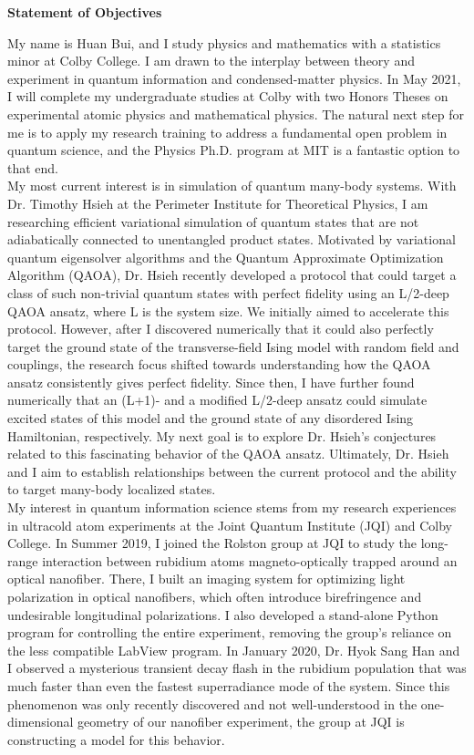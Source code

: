 \documentclass[12pt]{article}
\begin{document}
\begin{center}
	\textbf{Statement of Objectives}
\end{center}
My name is Huan Bui, and I study physics and mathematics with a statistics minor at Colby College. I am drawn to the interplay between theory and experiment in quantum information and condensed-matter physics.  In May 2021, I will complete my undergraduate studies at Colby with two Honors Theses on experimental atomic physics and mathematical physics. The natural next step for me is to apply my research training to address a fundamental open problem in quantum science, and the Physics Ph.D. program at MIT is a fantastic option to that end.  \\ 

My most current interest is in simulation of quantum many-body systems. With Dr. Timothy Hsieh at the Perimeter Institute for Theoretical Physics, I am researching efficient variational simulation of quantum states that are not adiabatically connected to unentangled product states. Motivated by variational quantum eigensolver algorithms and the Quantum Approximate Optimization Algorithm (QAOA), Dr. Hsieh recently developed a protocol that could target a class of such non-trivial quantum states with perfect fidelity using an L/2-deep QAOA ansatz, where L is the system size. We initially aimed to accelerate this protocol. However, after I discovered numerically that it could also perfectly target the ground state of the transverse-field Ising model with random field and couplings, the research focus shifted towards understanding how the QAOA ansatz consistently gives perfect fidelity. Since then, I have further found numerically that an (L+1)- and a modified L/2-deep ansatz could simulate excited states of this model and the ground state of any disordered Ising Hamiltonian, respectively. My next goal is to explore Dr. Hsieh's conjectures related to this fascinating behavior of the QAOA ansatz. Ultimately, Dr. Hsieh and I aim to establish relationships between the current protocol and the ability to target many-body localized states.\\

My interest in quantum information science stems from my research experiences in ultracold atom experiments at the Joint Quantum Institute (JQI) and Colby College. In Summer 2019, I joined the Rolston group at JQI to study the long-range interaction between rubidium atoms magneto-optically trapped around an optical nanofiber. There, I built an imaging system for optimizing light polarization in optical nanofibers, which often introduce birefringence and undesirable longitudinal polarizations. I also developed a stand-alone Python program for controlling the entire experiment, removing the group's reliance on the less compatible LabView program. In January 2020, Dr. Hyok Sang Han and I observed a mysterious transient decay flash in the rubidium population that was much faster than even the fastest superradiance mode of the system. Since this phenomenon was only recently discovered and not well-understood in the one-dimensional geometry of our nanofiber experiment, the group at JQI is constructing a model for this behavior.   \\ 
\end{document}
